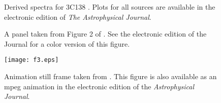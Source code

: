 \documentclass[manuscript]{aastex}
\begin{document}

\begin{figure}
\caption{Derived spectra for 3C138 \citep[see][]{heiles03}. Plots for all sources are available
in the electronic edition of {\it The Astrophysical Journal}.\label{fig1}}
\end{figure}

\clearpage


\begin{figure}
\caption{A panel taken from Figure 2 of \citet{rudnick03}.
See the electronic edition of the Journal for a color version
of this figure.\label{fig2}}
\end{figure}


\begin{figure}
\texttt{[image: f3.eps]}
\caption{Animation still frame taken from \citet{kim03}.
This figure is also available as an mpeg
animation in the electronic edition of the
{\it Astrophysical Journal}.}
\end{figure}




\end{document}
